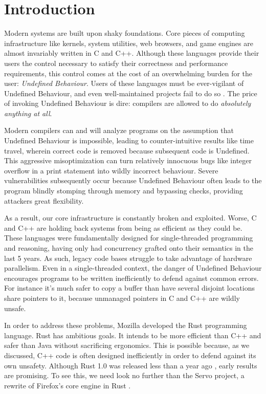 \chapter{Introduction}
\label{ch:intro}

Modern systems are built upon shaky foundations. Core pieces of computing
infrastructure like kernels, system utilities, web browsers, and game engines
are almost invariably written in C and C++. Although these languages provide
their users the control necessary to satisfy their correctness and performance
requirements, this control comes at the cost of an overwhelming burden for the
user: \emph{Undefined Behaviour}. Users of these languages must be ever-vigilant
of Undefined Behaviour, and even well-maintained projects fail to do so
\cite{wang2012undefined}. The price of invoking Undefined Behaviour is dire:
compilers are allowed to do \emph{absolutely anything at all}.

Modern compilers can and will analyze programs on the assumption that Undefined
Behaviour is impossible, leading to counter-intuitive results like time travel, \cite{timetravel}
wherein correct code is removed because subsequent code is Undefined. This
aggressive misoptimization can turn relatively innocuous bugs like integer
overflow in a print statement into wildly incorrect behaviour. Severe
vulnerabilities subsequently occur because Undefined Behaviour often leads to
the program blindly stomping through memory and bypassing checks, providing attackers
great flexibility.

As a result, our core infrastructure is constantly broken and exploited. Worse,
C and C++ are holding back systems from being as efficient as they could be.
These languages were fundamentally designed for single-threaded programming and
reasoning, having only had concurrency grafted onto their semantics in the last
5 years. As such, legacy code bases struggle to take advantage of hardware
parallelism. Even in a single-threaded context,
the danger of Undefined Behaviour encourages programs to be written
inefficiently to defend against common errors. For instance it's much safer
to copy a buffer than have several disjoint locations share pointers to it,
because unmanaged pointers in C and C++ are wildly unsafe.

In order to address these problems, Mozilla developed the Rust programming language.
Rust has ambitious goals. It intends to be more efficient than C++ and safer
than Java without sacrificing ergonomics. This is possible because, as we discussed,
C++ code is often designed inefficiently in order to defend against its own unsafety.
Although Rust 1.0 was released less than a year ago \cite{rust1}, early results
are promising. To see this, we need look no further than the Servo project, a
rewrite of Firefox's core engine in Rust
\cite{servo}.

